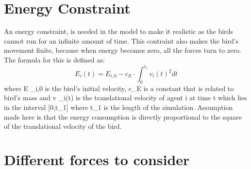 \documentclass[12pt]{article}
\begin{document}
\section{Energy Constraint}
An energy constraint, is needed in the model to make it realistic as the birds cannot run for an infinite amount of time. This contraint also makes the bird's movement finite, because when energy becomes zero, all the forces turn to zero. The formula for this is defined as:
\begin{equation}
E _{i} (t) = E _{i,0} - c _{E} \cdot \int_{0}^{t _{1}} v _{i} (t)^2 dt   
\end{equation}
where E _{i,0} is the bird's initial velocity, c_{E} is a constant that is related to bird's mass and v _{i}(t) is the translational velocity of agent i at time t which lies in the interval [0,t_{1}] where t_{1} is the length of the simulation. Assumption made here is that the energy consumption is directly proportional to the square of the translational velocity of the bird.

\section{Different forces to consider}
\end{document}
